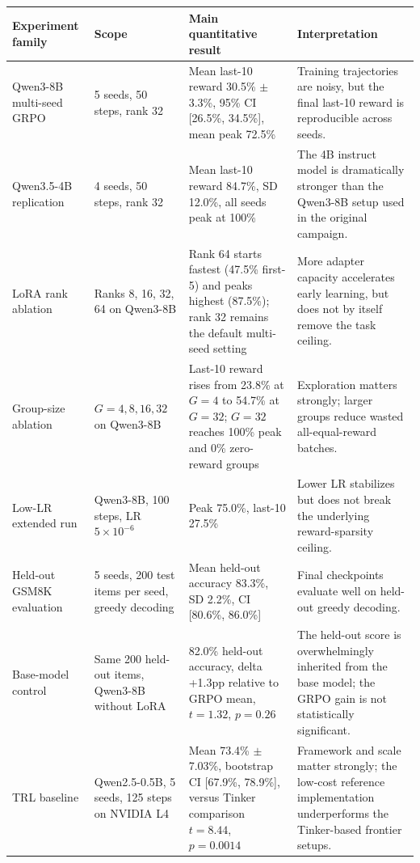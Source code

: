 \small
\begin{center}
\begin{tabularx}{\textwidth}{L{2.7cm}L{3.3cm}L{2.6cm}Y}
\toprule
Experiment family & Scope & Main quantitative result & Interpretation \\
\midrule
Qwen3-8B multi-seed GRPO & 5 seeds, 50 steps, rank 32 & Mean last-10 reward 30.5\% $\pm$ 3.3\%, 95\% CI [26.5\%, 34.5\%], mean peak 72.5\% & Training trajectories are noisy, but the final last-10 reward is reproducible across seeds. \\
Qwen3.5-4B replication & 4 seeds, 50 steps, rank 32 & Mean last-10 reward 84.7\%, SD 12.0\%, all seeds peak at 100\% & The 4B instruct model is dramatically stronger than the Qwen3-8B setup used in the original campaign. \\
LoRA rank ablation & Ranks 8, 16, 32, 64 on Qwen3-8B & Rank 64 starts fastest (47.5\% first-5) and peaks highest (87.5\%); rank 32 remains the default multi-seed setting & More adapter capacity accelerates early learning, but does not by itself remove the task ceiling. \\
Group-size ablation & $G=4,8,16,32$ on Qwen3-8B & Last-10 reward rises from 23.8\% at $G=4$ to 54.7\% at $G=32$; $G=32$ reaches 100\% peak and 0\% zero-reward groups & Exploration matters strongly; larger groups reduce wasted all-equal-reward batches. \\
Low-LR extended run & Qwen3-8B, 100 steps, LR $5\times10^{-6}$ & Peak 75.0\%, last-10 27.5\% & Lower LR stabilizes but does not break the underlying reward-sparsity ceiling. \\
Held-out GSM8K evaluation & 5 seeds, 200 test items per seed, greedy decoding & Mean held-out accuracy 83.3\%, SD 2.2\%, CI [80.6\%, 86.0\%] & Final checkpoints evaluate well on held-out greedy decoding. \\
Base-model control & Same 200 held-out items, Qwen3-8B without LoRA & 82.0\% held-out accuracy, delta +1.3pp relative to GRPO mean, $t=1.32$, $p=0.26$ & The held-out score is overwhelmingly inherited from the base model; the GRPO gain is not statistically significant. \\
TRL baseline & Qwen2.5-0.5B, 5 seeds, 125 steps on NVIDIA L4 & Mean 73.4\% $\pm$ 7.03\%, bootstrap CI [67.9\%, 78.9\%], versus Tinker comparison $t=8.44$, $p=0.0014$ & Framework and scale matter strongly; the low-cost reference implementation underperforms the Tinker-based frontier setups. \\
\bottomrule
\end{tabularx}
\end{center}
\normalsize

